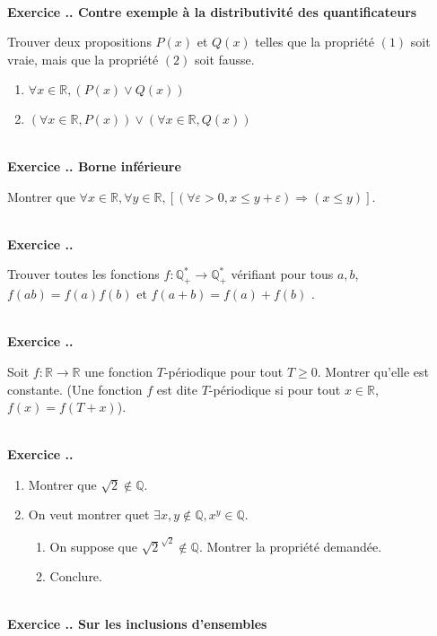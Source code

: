 \documentclass{article}
\newcommand{\mb}[1]{\mathbb{#1}}
\newcounter{exo}
\newcommand{\exercice}[1][\null]{\textbf{\\ \large Exercice \thesection.\theexo. \normalsize #1} \addtocounter{exo}{1}}
\begin{document}
\exercice[Contre exemple à la distributivité des quantificateurs]

Trouver deux propositions $P(x)$ et $Q(x)$ telles que la propriété 
$(1)$ soit vraie, mais que la propriété $(2)$ soit fausse.

\begin{enumerate}[(1)]
    \item $\forall x \in \mathbb{R}, (P (x) \vee Q(x))$
    \item $\left(\forall x \in \mathbb{R}, P(x)\right) 
        \vee 
        \left(\forall x \in \mathbb{R}, Q(x)\right)$
\end{enumerate}

\exercice[Borne inférieure]

Montrer que $\forall x \in \mb{R}, \forall y \in \mb{R}, \left[ (\forall \varepsilon > 0, x \le y + \varepsilon) \Rightarrow (x \le y) \right]$.

\exercice

Trouver toutes les fonctions $f : \mb{Q}_{+}^* \rightarrow \mb{Q}_{+}^*$ vérifiant pour tous $a,b$, $f(ab) = f(a)f(b)$ et $f(a+b) = f(a)+f(b)$ .



\exercice

Soit $f : \mb{R} \rightarrow \mb{R}$ une fonction $T$-périodique pour tout $T \ge 0$. Montrer qu'elle est constante. (Une fonction $f$ est dite $T$-périodique si pour tout $x \in \mb{R}$, $f(x) = f(T+x)$).

\exercice

\begin{enumerate}

\item Montrer que $\sqrt{2} \not \in \mb{Q}$.

\item On veut montrer quet $\exists x, y \not \in \mb{Q}, x^y \in \mb{Q}$.

\begin{enumerate}

\item On suppose que $\sqrt{2}^{\sqrt{2}} \not \in \mb{Q}$. Montrer la propriété demandée.

\item Conclure.

\end{enumerate}



\end{enumerate}


\exercice[Sur les inclusions d'ensembles]
\end{document}
